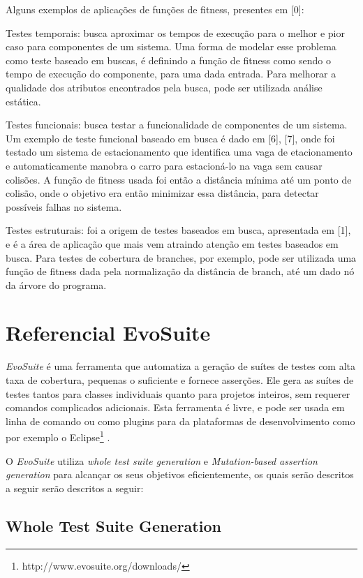 \documentclass[12pt,a4paper]{article}
\begin{document}
Alguns exemplos de aplicações de funções de fitness, presentes em [0]:

Testes temporais: busca aproximar os tempos de execução para o melhor e pior caso para componentes de um sistema. Uma forma de modelar esse problema como teste baseado em buscas, é definindo a função de fitness como sendo o tempo de execução do componente, para uma dada entrada. Para melhorar a qualidade dos atributos encontrados pela busca, pode ser utilizada análise estática.

Testes funcionais: busca testar a funcionalidade de componentes de um sistema. Um exemplo de teste funcional baseado em busca é dado em [6], [7], onde foi testado um sistema de estacionamento que identifica uma vaga de etacionamento e automaticamente manobra o carro para estacioná-lo na vaga sem causar colisões. A função de fitness usada foi então a distância mínima até um ponto de colisão, onde o objetivo era então minimizar essa distância, para detectar possíveis falhas no sistema.

Testes estruturais: foi a origem de testes baseados em busca, apresentada em [1], e é a área de aplicação que mais vem atraindo atenção em testes baseados em busca. Para testes de cobertura de branches, por exemplo, pode ser utilizada uma função de fitness dada pela normalização da distância de branch, até um dado nó da árvore do programa.



\section{Referencial EvoSuite}

\textit{EvoSuite} é uma ferramenta que automatiza a geração de suítes de testes com alta taxa de cobertura, pequenas o suficiente e fornece asserções. Ele gera as suítes de testes tantos para classes individuais quanto para projetos inteiros, sem requerer comandos complicados adicionais. Esta ferramenta é livre, e pode ser usada em linha de comando ou como  plugins para da plataformas de desenvolvimento como por exemplo o Eclipse\footnote{http://www.evosuite.org/downloads/} \cite{fraser2011evosuite}.

O \textit{EvoSuite} utiliza \textit{whole test suite generation} e \textit{Mutation-based assertion generation} para alcançar os seus objetivos eficientemente, os quais serão descritos a seguir serão descritos a seguir:

\subsection{Whole Test Suite Generation}
\end{document}
